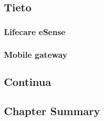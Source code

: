\subsection{Tieto}
\label{sub:tieto}

\subsubsection{Lifecare eSense}
\label{subsub:eSense}

\subsubsection{Mobile gateway}
\label{subsub:gateway}

\subsection{Continua}
\label{sub:continua}

\subsection{Chapter Summary}
\label{sub:backSum}